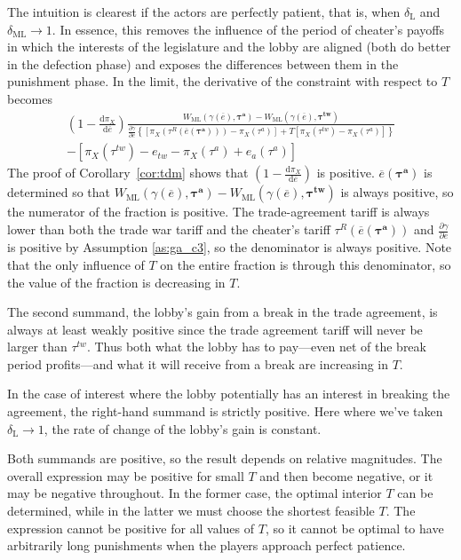 \documentclass[authoryear, review]{elsarticle}
\newcommand{\ov}{\overline}
\newcommand{\bta}{\bm{\tau^a}}
\newcommand{\ga}{\gamma}
\newcommand{\btw}{\bm{\tau^{tw}}}
\newcommand{\de}{\delta}
\begin{document}
The intuition is clearest if the actors are perfectly patient, that is, when $\de_\text{L}$ and $\de_\text{ML} \rightarrow 1$. In essence, this removes the influence of the period of cheater's payoffs in which the interests of the legislature and the lobby are aligned (both do better in the defection phase) and exposes the differences between them in the punishment phase. In the limit, the derivative of the constraint with respect to $T$ becomes
\begin{multline}
  \left(1 - \frac{\mathrm{d} \pi_X}{\mathrm{d} \ov{e}} \right) \frac{ W_\text{ML}(\ga(\ov{e}),\bta) - W_\text{ML}(\ga(\ov{e}),\btw) }{\frac{\partial \ga}{\partial e} \left\{
  \left[ \pi_X(\tau^R(\ov{e}(\bta))) - \pi_X(\tau^a) \right] + T \left[ \pi_X(\tau^{tw}) - \pi_X(\tau^a) \right]\right\}} \\ - \left[ \pi_X(\tau^{tw}) - e_{tw} -\pi_X(\tau^a) + e_a(\tau^a) \right]
 	\label{ine:Tdelta1}
\end{multline}
The proof of Corollary~\ref{cor:tdm} shows that $\left(1 - \frac{\mathrm{d} \pi_X}{\mathrm{d} \ov{e}} \right)$ is positive. $\ov{e}(\bta)$ is determined so that $W_\text{ML}(\ga(\ov{e}),\bta) - W_\text{ML}(\ga(\ov{e}),\btw)$ is always positive, so the numerator of the fraction is positive. The trade-agreement tariff is always lower than both the trade war tariff and the cheater's tariff $\tau^R\left(\ov{e}(\bta)\right)$ and $\frac{\partial \ga}{\partial e}$ is positive by Assumption \ref{as:ga_c3}, so the denominator is always positive. Note that the only influence of $T$ on the entire fraction is through this denominator, so the value of the fraction is decreasing in $T$.

The second summand, the lobby's gain from a break in the trade agreement, is always at least weakly positive since the trade agreement tariff will never be larger than $\tau^{tw}$. Thus both what the lobby has to pay---even net of the break period profits---and what it will receive from a break are increasing in $T$.

In the case of interest where the lobby potentially has an interest in breaking the agreement, the right-hand summand is strictly positive. Here where we've taken $\de_\text{L} \rightarrow 1$, the rate of change of the lobby's gain is constant.

Both summands are positive, so the result depends on relative magnitudes. The overall expression may be positive for small $T$ and then become negative, or it may be negative throughout. In the former case, the optimal interior $T$ can be determined, while in the latter we must choose the shortest feasible $T$. The expression cannot be positive for all values of $T$, so it cannot be optimal to have arbitrarily long punishments when the players approach perfect patience.
\end{document}
